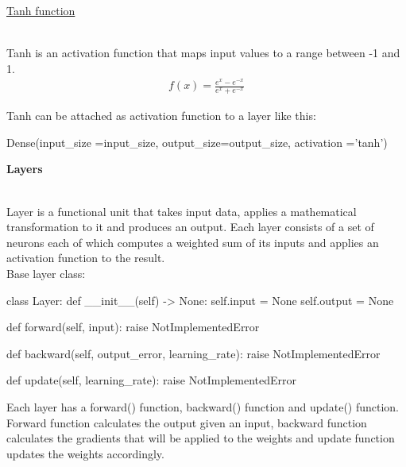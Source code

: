 \documentclass{article}
\begin{document}
    \hypertarget{tanh}{\underline{Tanh function}} \\

    Tanh is an activation function that maps input values to a range 
    between -1 and 1.
    \begin{align*}
        f(x) = \frac{e^{x} - e^{-x}}{e^{x} + e^{-x}}
    \end{align*}

    \begin{center}    
        \end{center}
    Tanh can be attached as activation function to a layer like this:
\begin{python}
Dense(input_size =input_size,
      output_size=output_size,
      activation ='tanh')
\end{python}
    \clearpage

    \hypertarget{layers}{\textbf{Layers}} \\

    Layer is a functional unit that takes input data, applies a 
    mathematical transformation to it and produces an output. Each layer 
    consists of a set of neurons each of which computes a weighted sum of 
    its inputs and applies an activation function to the result. \\

    Base layer class:
    \begin{python}
class Layer:
    def __init__(self) -> None:
        self.input = None
        self.output = None

    def forward(self, input):
        raise NotImplementedError

    def backward(self, output_error, learning_rate):
        raise NotImplementedError

    def update(self, learning_rate):
        raise NotImplementedError
    \end{python}
    Each layer has a forward() function, backward() function and update() function. Forward function
    calculates the output given an input, backward function calculates the gradients that will be applied to 
    the weights and update function updates the weights accordingly.
    \pagebreak
\end{document}
